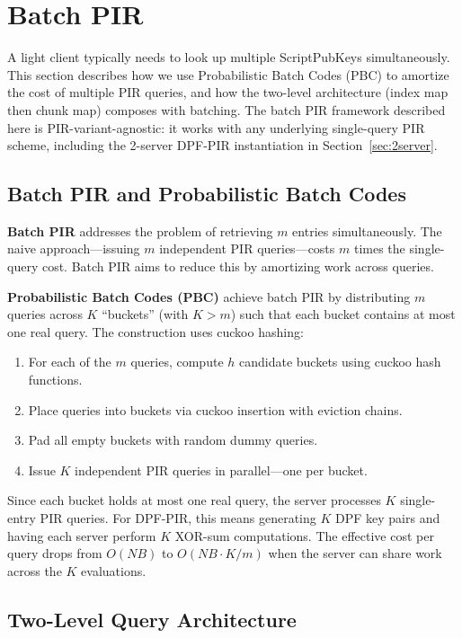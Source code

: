 \section{Batch PIR}
\label{sec:batching}

A light client typically needs to look up multiple ScriptPubKeys simultaneously. This section describes how we use Probabilistic Batch Codes (PBC) to amortize the cost of multiple PIR queries, and how the two-level architecture (index map then chunk map) composes with batching. The batch PIR framework described here is PIR-variant-agnostic: it works with any underlying single-query PIR scheme, including the 2-server DPF-PIR instantiation in Section~\ref{sec:2server}.

\subsection{Batch PIR and Probabilistic Batch Codes}

\textbf{Batch PIR} \cite{IKOS04} addresses the problem of retrieving $m$ entries simultaneously. The naive approach---issuing $m$ independent PIR queries---costs $m$ times the single-query cost. Batch PIR aims to reduce this by amortizing work across queries.

\textbf{Probabilistic Batch Codes (PBC)} achieve batch PIR by distributing $m$ queries across $K$ ``buckets'' (with $K > m$) such that each bucket contains at most one real query. The construction uses cuckoo hashing:
\begin{enumerate}[nolistsep,leftmargin=*]
    \item For each of the $m$ queries, compute $h$ candidate buckets using cuckoo hash functions.
    \item Place queries into buckets via cuckoo insertion with eviction chains.
    \item Pad all empty buckets with random dummy queries.
    \item Issue $K$ independent PIR queries in parallel---one per bucket.
\end{enumerate}

Since each bucket holds at most one real query, the server processes $K$ single-entry PIR queries. For DPF-PIR, this means generating $K$ DPF key pairs and having each server perform $K$ XOR-sum computations. The effective cost per query drops from $O(NB)$ to $O(NB \cdot K/m)$ when the server can share work across the $K$ evaluations.

\subsection{Two-Level Query Architecture}

